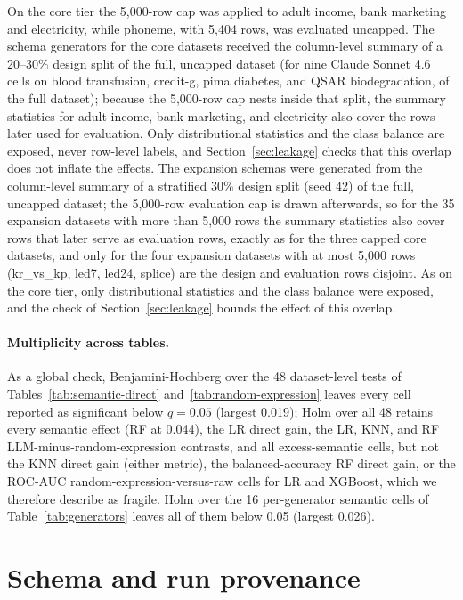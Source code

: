 On the core tier the 5,000-row cap was applied to adult income, bank marketing and electricity, while phoneme, with 5,404 rows, was evaluated uncapped. The schema generators for the core datasets received the column-level summary of a 20--30\% design split of the full, uncapped dataset (for nine Claude Sonnet 4.6 cells on blood transfusion, credit-g, pima diabetes, and QSAR biodegradation, of the full dataset); because the 5,000-row cap nests inside that split, the summary statistics for adult income, bank marketing, and electricity also cover the rows later used for evaluation. Only distributional statistics and the class balance are exposed, never row-level labels, and Section~\ref{sec:leakage} checks that this overlap does not inflate the effects. The expansion schemas were generated from the column-level summary of a stratified 30\% design split (seed 42) of the full, uncapped dataset; the 5,000-row evaluation cap is drawn afterwards, so for the 35 expansion datasets with more than 5,000 rows the summary statistics also cover rows that later serve as evaluation rows, exactly as for the three capped core datasets, and only for the four expansion datasets with at most 5,000 rows (kr\_vs\_kp, led7, led24, splice) are the design and evaluation rows disjoint. As on the core tier, only distributional statistics and the class balance were exposed, and the check of Section~\ref{sec:leakage} bounds the effect of this overlap.

\paragraph{Multiplicity across tables.}

As a global check, Benjamini-Hochberg over the 48 dataset-level tests of Tables~\ref{tab:semantic-direct} and~\ref{tab:random-expression} leaves every cell reported as significant below \(q = 0.05\) (largest 0.019); Holm over all 48 retains every semantic effect (RF at 0.044), the LR direct gain, the LR, KNN, and RF LLM-minus-random-expression contrasts, and all excess-semantic cells, but not the KNN direct gain (either metric), the balanced-accuracy RF direct gain, or the ROC-AUC random-expression-versus-raw cells for LR and XGBoost, which we therefore describe as fragile. Holm over the 16 per-generator semantic cells of Table~\ref{tab:generators} leaves all of them below 0.05 (largest 0.026).


\section{Schema and run provenance}\label{app:provenance}

